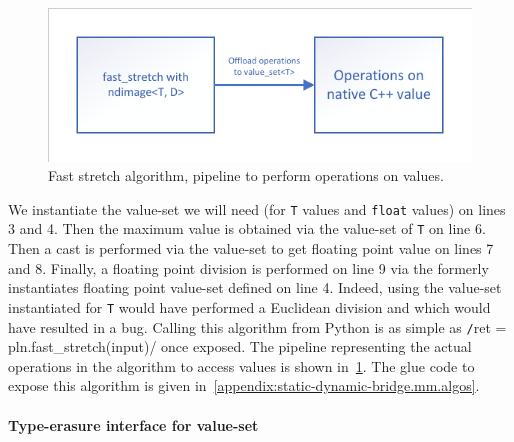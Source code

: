 \begin{figure}[htbp]
  \centering
  \includegraphics[width=.8\linewidth]{../figures/static_dynamic_bridge/fast_stretch}
  \caption{Fast stretch algorithm, pipeline to perform operations on values.}
  \label{fig:static_dyn.fast_stretch}
\end{figure}

We instantiate the value-set we will need (for \texttt{T} values and \texttt{float} values) on lines 3 and 4. Then the
maximum value is obtained via the value-set of \texttt{T} on line 6. Then a cast is performed via the value-set to get
floating point value on lines 7 and 8. Finally, a floating point division is performed on line 9 via the formerly
instantiates floating point value-set defined on line 4. Indeed, using the value-set instantiated for \texttt{T} would
have performed a Euclidean division and which would have resulted in a bug. Calling this algorithm from Python is as
simple as \texttt/ret = pln.fast_stretch(input)/ once exposed. The pipeline representing the actual
operations in the algorithm to access values is shown in~\cref{fig:static_dyn.fast_stretch}. The glue code to expose
this algorithm is given in~\cref{appendix:static-dynamic-bridge.mm.algos}.

\paragraph{Type-erasure interface for value-set}

